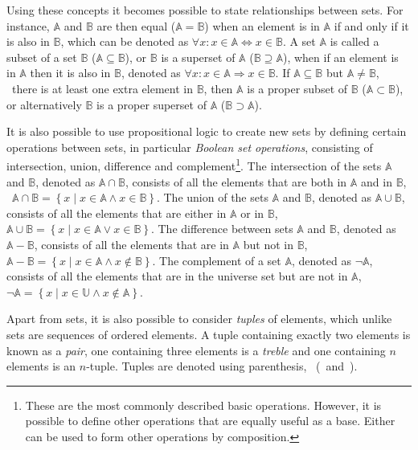 Using these concepts it becomes possible to state relationships between sets.
For instance, $\mathbb{A}$ and $\mathbb{B}$ are then equal ($\mathbb{A} = \mathbb{B}$) when an element is in $\mathbb{A}$ if and only if it is also in $\mathbb{B}$, which can be denoted as $\forall x : x \in \mathbb{A} \Leftrightarrow x \in \mathbb{B}$.
A set $\mathbb{A}$ is called a subset of a set $\mathbb{B}$ ($\mathbb{A} \subseteq \mathbb{B}$), or $\mathbb{B}$ is a superset of $\mathbb{A}$ ($\mathbb{B} \supseteq \mathbb{A}$), when if an element is in $\mathbb{A}$ then it is also in $\mathbb{B}$, denoted as $\forall x : x \in \mathbb{A} \Rightarrow x \in \mathbb{B}$.
If $\mathbb{A} \subseteq \mathbb{B}$ but $\mathbb{A} \neq \mathbb{B}$, \ie\ there is at least one extra element in $\mathbb{B}$, then $\mathbb{A}$ is a proper subset of $\mathbb{B}$ ($\mathbb{A} \subset \mathbb{B}$), or alternatively $\mathbb{B}$ is a proper superset of $\mathbb{A}$ ($\mathbb{B} \supset \mathbb{A}$).

It is also possible to use propositional logic to create new sets by defining certain operations between sets, in particular \emph{Boolean set operations}, consisting of intersection, union, difference and complement\footnote{These are the most commonly described basic operations. However, it is possible to define other operations that are equally useful as a base. Either can be used to form other operations by composition.}.
The intersection of the sets $\mathbb{A}$ and $\mathbb{B}$, denoted as $\mathbb{A} \cap \mathbb{B}$, consists of all the elements that are both in $\mathbb{A}$ and in $\mathbb{B}$, \ie\ $\mathbb{A} \cap \mathbb{B} = \left\{ x \mid x \in \mathbb{A} \wedge x \in \mathbb{B} \right\}$.
The union of the sets $\mathbb{A}$ and $\mathbb{B}$, denoted as $\mathbb{A} \cup \mathbb{B}$, consists of all the elements that are either in $\mathbb{A}$ or in $\mathbb{B}$, \ie\ $\mathbb{A} \cup \mathbb{B} = \left\{ x \mid x \in \mathbb{A} \vee x \in \mathbb{B} \right\}$.
The difference between sets $\mathbb{A}$ and $\mathbb{B}$, denoted as $\mathbb{A} - \mathbb{B}$, consists of all the elements that are in $\mathbb{A}$ but not in $\mathbb{B}$, \ie\ $\mathbb{A} - \mathbb{B} = \left\{ x \mid x \in \mathbb{A} \wedge x \notin \mathbb{B} \right\}$.
The complement of a set $\mathbb{A}$, denoted as $\neg \mathbb{A}$, consists of all the elements that are in the universe set but are not in $\mathbb{A}$, \ie\ $\neg \mathbb{A} = \left\{ x \mid x \in \mathbb{U} \wedge x \notin \mathbb{A} \right\}$.

Apart from sets, it is also possible to consider \emph{tuples} of elements, which unlike sets are sequences of ordered elements.
A tuple containing exactly two elements is known as a \emph{pair}, one containing three elements is a \emph{treble} and one containing $n$ elements is an $n$-tuple.
Tuples are denoted using parenthesis, \ie\ (\ and~).

